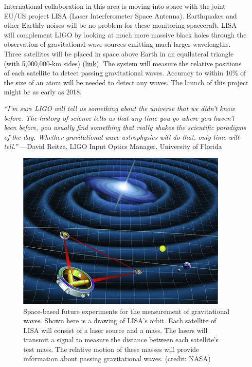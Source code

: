 \documentclass[
]{book}
\begin{document}
International collaboration in this area is moving into space with the
joint EU/US project LISA (Laser Interferometer Space Antenna).
Earthquakes and other Earthly noises will be no problem for these
monitoring spacecraft. LISA will complement LIGO by looking at much more
massive black holes through the observation of gravitational-wave
sources emitting much larger wavelengths. Three satellites will be
placed in space above Earth in an equilateral triangle (with
5,000,000-km sides)
(\protect\hyperlink{import-auto-id3032532}{link}). The system
will measure the relative positions of each satellite to detect passing
gravitational waves. Accuracy to within 10\% of the size of an atom will
be needed to detect any waves. The launch of this project might be as
early as 2018.

\emph{``I'm sure LIGO will tell us something about the universe that we didn't
know before. The history of science tells us that any time you go where
you haven't been before, you usually find something that really shakes
the scientific paradigms of the day. Whether gravitational wave
astrophysics will do that, only time will tell.''} ---David Reitze, LIGO
Input Optics Manager, University of Florida

\begin{figure}
\hypertarget{import-auto-id3032532}{%
\centering
\includegraphics{images/Figure_04_08_04.jpg}
\caption{Space-based future experiments for the measurement of gravitational
waves. Shown here is a drawing of LISA's orbit. Each satellite of LISA
will consist of a laser source and a mass. The lasers will transmit a
signal to measure the distance between each satellite's test mass. The
relative motion of these masses will provide information about passing
gravitational waves. (credit:
NASA)}\label{import-auto-id3032532}
}
\end{figure}
\end{document}
